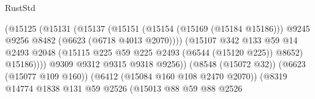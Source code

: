 \begin{lexlean}{RustStd}
\begin{coremodule}
                                                  (@15125
                                                    (@15131
                                                      (@15137
                                                        (@15151
                                                          (@15154 (@15169 (@15184 @15186)))
                                                          @9245
                                                          @9256
                                                          @8482
                                                          (@6623 (@6718 @4013 @2070))))
                                                      (@15107
                                                        @342
                                                        @133
                                                        @59
                                                        @14
                                                        @2493
                                                        @2048
                                                        (@15115
                                                          @225
                                                          @59
                                                          @225
                                                          @2493
                                                          (@6544 (@15120 @225))
                                                          @8652)
                                                        @15186))))
                                                @9309
                                                @9312
                                                @9315
                                                @9318
                                                @9256))
                                            (@8548 (@15072 @32))
                                            (@6623 (@15077 @109 @160))
                                            (@6412 (@15084 @160 @108 @2470 @2070))
                                            (@8319
                                              @14774
                                              @1838
                                              @131
                                              @59
                                              @2526
                                              (@15013
                                                @88
                                                @59
                                                @88
                                                @2526

\end{coremodule}
\end{lexlean}
